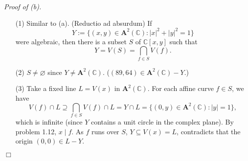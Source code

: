 \documentclass{article}
\begin{document}
\emph{Proof of (b).}
\begin{enumerate}
\item[(1)]
  Similar to (a).
  (Reductio ad absurdum)
  If
  \[
    Y := \{ (x,y) \in \mathbf{A}^{2}(\mathbb{C}) : |x|^2 + |y|^2 = 1 \}
  \]
  were algebraic,
  then there is a subset $S$ of $\mathbb{C}[x,y]$ such that
  \[
    Y = V(S) = \bigcap_{f \in S} V(f).
  \]

\item[(2)]
  $S \neq \varnothing$ since $Y \neq \mathbf{A}^{2}(\mathbb{C})$.
  ($(89,64) \in \mathbf{A}^{2}(\mathbb{C})-Y$.)

\item[(3)]
  Take a fixed line $L = V(x)$ in $\mathbf{A}^{2}(\mathbb{C})$.
  For each affine curve $f \in S$, we have
  \[
    V(f) \cap L
    \supseteq
    \bigcap_{f \in S} V(f) \cap L
    = Y \cap L
    = \{ (0,y) \in \mathbf{A}^{2}(\mathbb{C}) : |y| = 1 \},
  \]
  which is infinite (since $Y$ contains a unit circle in the complex plane).
  By problem 1.12, $x \mid f$.
  As $f$ runs over $S$, $Y \subseteq V(x) = L$,
  contradicts that the origin $(0,0) \in L-Y$.
\end{enumerate}
$\Box$ \\
\end{document}
